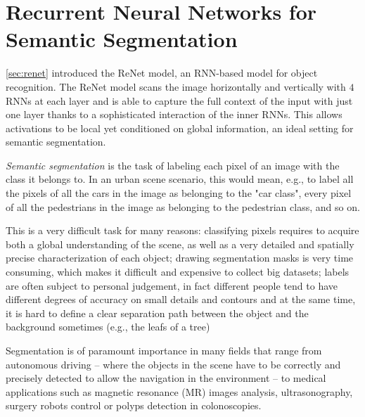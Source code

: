 \chapter{Recurrent Neural Networks for Semantic Segmentation}\label{sec:reseg}

\autoref{sec:renet} introduced the ReNet model, an RNN-based model for object
recognition. The ReNet model scans the image horizontally and vertically with
$4$ RNNs at each layer and is able to capture the full context of the input
with just one layer thanks to a sophisticated interaction of the inner RNNs.
This allows activations to be local yet conditioned on global information, an
ideal setting for semantic segmentation.

\emph{Semantic segmentation} is the task of labeling each pixel of an image
with the class it belongs to. In an urban scene scenario, this would mean,
e.g., to label all the pixels of all the cars in the image as belonging to the
"car class", every pixel of all the pedestrians in the image as belonging to
the pedestrian class, and so on.

This is a very difficult task for many reasons: classifying pixels requires to
acquire both a global understanding of the scene, as well as a very detailed
and spatially precise characterization of each object; drawing segmentation
masks is very time consuming, which makes it difficult and expensive to collect
big datasets; labels are often subject to personal judgement, in fact different
people tend to have different degrees of accuracy on small details and
contours and at the same time, it is hard to define a clear separation path
between the object and the background sometimes (e.g., the leafs of a tree)

Segmentation is of paramount importance in many fields that range from
autonomous driving -- where the objects in the scene have to be correctly and
precisely detected to allow the navigation in the environment -- to medical
applications such as magnetic resonance (MR) images analysis, ultrasonography,
surgery robots control or polyps detection in colonoscopies.


